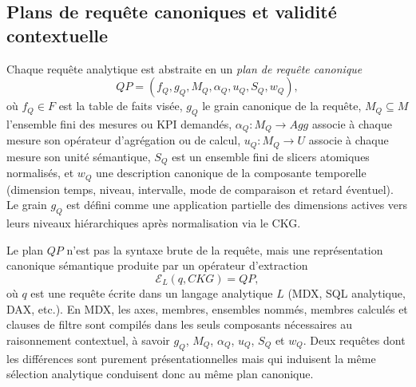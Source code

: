 \documentclass[journal]{IEEEtran}
\begin{document}
\subsection{Plans de requête canoniques et validité contextuelle}

Chaque requête analytique est abstraite en un \emph{plan de requête canonique}
\[
QP=(f_Q,g_Q,M_Q,\alpha_Q,u_Q,S_Q,w_Q),
\]
où $f_Q\in F$ est la table de faits visée, $g_Q$ le grain canonique de la requête, $M_Q\subseteq M$ l'ensemble fini des mesures ou KPI demandés, $\alpha_Q: M_Q \rightarrow Agg$ associe à chaque mesure son opérateur d'agrégation ou de calcul, $u_Q: M_Q \rightarrow U$ associe à chaque mesure son unité sémantique, $S_Q$ est un ensemble fini de slicers atomiques normalisés, et $w_Q$ une description canonique de la composante temporelle (dimension temps, niveau, intervalle, mode de comparaison et retard éventuel). Le grain $g_Q$ est défini comme une application partielle des dimensions actives vers leurs niveaux hiérarchiques après normalisation via le CKG.

Le plan $QP$ n'est pas la syntaxe brute de la requête, mais une représentation canonique sémantique produite par un opérateur d'extraction
\[
\mathcal{E}_L(q,CKG)=QP,
\]
où $q$ est une requête écrite dans un langage analytique $L$ (MDX, SQL analytique, DAX, etc.). En MDX, les axes, membres, ensembles nommés, membres calculés et clauses de filtre sont compilés dans les seuls composants nécessaires au raisonnement contextuel, à savoir $g_Q$, $M_Q$, $\alpha_Q$, $u_Q$, $S_Q$ et $w_Q$. Deux requêtes dont les différences sont purement présentationnelles mais qui induisent la même sélection analytique conduisent donc au même plan canonique.
\end{document}
